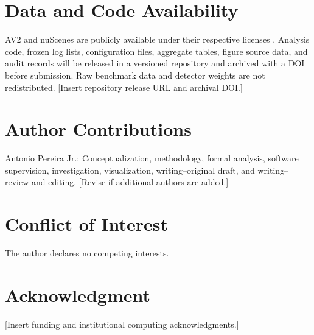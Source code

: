 \documentclass[journal]{IEEEtran}
\begin{document}
\section*{Data and Code Availability}
AV2 and nuScenes are publicly available under their respective licenses \cite{Wilson2021AV2,Caesar2020nuScenes}. Analysis code, frozen log lists, configuration files, aggregate tables, figure source data, and audit records will be released in a versioned repository and archived with a DOI before submission. Raw benchmark data and detector weights are not redistributed. [Insert repository release URL and archival DOI.]

\section*{Author Contributions}
Antonio Pereira Jr.: Conceptualization, methodology, formal analysis, software supervision, investigation, visualization, writing--original draft, and writing--review and editing. [Revise if additional authors are added.]

\section*{Conflict of Interest}
The author declares no competing interests.

\section*{Acknowledgment}
[Insert funding and institutional computing acknowledgments.]

\balance


\end{document}
